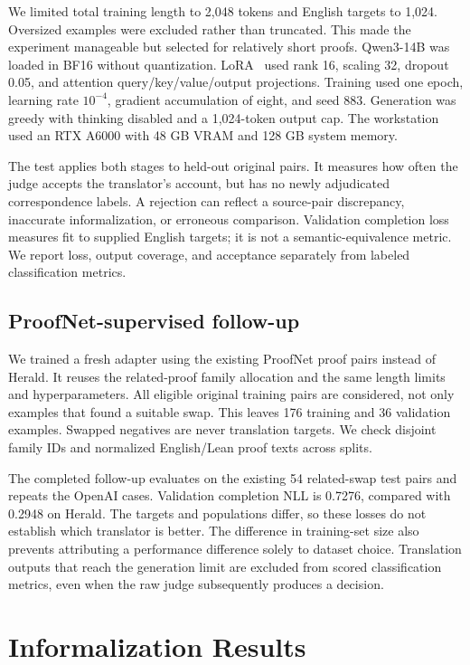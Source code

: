 \documentclass[sigconf,nonacm]{acmart}
\begin{document}
We limited total training length to 2,048 tokens and English targets to 1,024. Oversized examples were excluded rather than truncated. This made the experiment manageable but selected for relatively short proofs. Qwen3-14B was loaded in BF16 without quantization. LoRA~\cite{lora} used rank 16, scaling 32, dropout 0.05, and attention query/key/value/output projections. Training used one epoch, learning rate $10^{-4}$, gradient accumulation of eight, and seed 883. Generation was greedy with thinking disabled and a 1,024-token output cap. The workstation used an RTX A6000 with 48 GB VRAM and 128 GB system memory.

The test applies both stages to held-out original pairs. It measures how often the judge accepts the translator's account, but has no newly adjudicated correspondence labels. A rejection can reflect a source-pair discrepancy, inaccurate informalization, or erroneous comparison. Validation completion loss measures fit to supplied English targets; it is not a semantic-equivalence metric. We report loss, output coverage, and acceptance separately from labeled classification metrics.

\subsection{ProofNet-supervised follow-up}
We trained a fresh adapter using the existing ProofNet proof pairs instead of Herald. It reuses the related-proof family allocation and the same length limits and hyperparameters. All eligible original training pairs are considered, not only examples that found a suitable swap. This leaves 176 training and 36 validation examples. Swapped negatives are never translation targets. We check disjoint family IDs and normalized English/Lean proof texts across splits.

The completed follow-up evaluates on the existing 54 related-swap test pairs and repeats the OpenAI cases. Validation completion NLL is 0.7276, compared with 0.2948 on Herald. The targets and populations differ, so these losses do not establish which translator is better. The difference in training-set size also prevents attributing a performance difference solely to dataset choice. Translation outputs that reach the generation limit are excluded from scored classification metrics, even when the raw judge subsequently produces a decision.

\section{Informalization Results}
\end{document}
